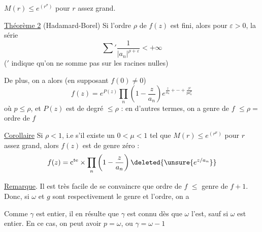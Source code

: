   $M(r)\leq e^{(r^\sigma)}$ pour $r$ assez grand.

\uline{Théorème 2} (Hadamard-Borel) Si l'ordre $\rho$ de $f(z)$
est fini, alors pour  $\varepsilon>0$, la série
\[
\sum{}'\frac{1}{|a_n|^{\rho+\varepsilon}}<+\infty \tag*{(5)}
\]
($'$ indique
qu'on ne somme pas sur les racines nulles)

De plus, on a alors (en supposant $f(0)\ne0$)
\[
f(z)=e^{P(z)}\prod_n\left(1-\frac{z}{a_n}\right)e^{\frac{z}{a_n}+\mathord{-}+\frac{z^p}{p a_n^p}}
\]
où $p\leq\rho$, et $P(z)$ est  
de degré $\leq\rho$ : en d'autres termes, on
a \qquad genre de $f$ $\leq\rho=$ ordre de $f$

\uline{Corollaire} \quad Si $\rho<1$, i.e s'il existe un $0<\mu<1$
tel que $M(r)\leq e^{(r^\mu)}$ pour $r$ assez grand,
alors $f(z)$ est de genre zéro :
\[
f(z)=\mathrm{c}^{\mathrm{te}}\mathbin{\times}\prod_n\left(1-\frac{z}{a_n}\right)\deleted{\unsure{e^{z/a_n}}}
\]

\uline{Remarque}. \quad Il est très facile de se convaincre
que \qquad ordre de $f$ $\leq$ genre de $f+1$. Donc, si $\omega$ et
$g$ sont respectivement le genre et l'ordre, on a
\begin{center}
\end{center}

Comme $\gamma$ est entier, il en résulte que $\gamma$
est connu dès que $\omega$ l'est, sauf si $\omega$ est
entier. En ce cas, on peut avoir $p=\omega$, ou
$\gamma=\omega-1$
